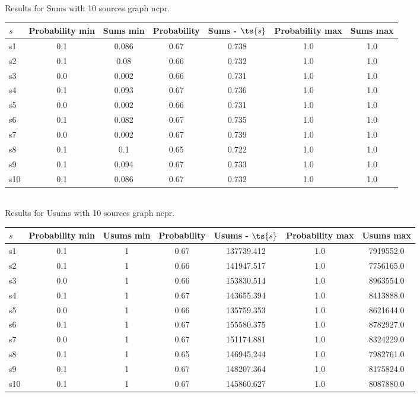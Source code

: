 \documentclass{article}
\begin{document}
\noindent Results for Sums with 10 sources graph ncpr.

\noindent\begin{tabular}{|l|c|c|c|c|c|c|}
\hline
$s$& Probability min & Sums min & Probability & Sums - $\ts{s}$ & Probability max & Sums max\\
\hline
s1 &0.1 & 0.086 & 0.67 & 0.738 & 1.0 & 1.0\\
\hline
s2 &0.1 & 0.08 & 0.66 & 0.732 & 1.0 & 1.0\\
\hline
s3 &0.0 & 0.002 & 0.66 & 0.731 & 1.0 & 1.0\\
\hline
s4 &0.1 & 0.093 & 0.67 & 0.736 & 1.0 & 1.0\\
\hline
s5 &0.0 & 0.002 & 0.66 & 0.731 & 1.0 & 1.0\\
\hline
s6 &0.1 & 0.082 & 0.67 & 0.735 & 1.0 & 1.0\\
\hline
s7 &0.0 & 0.002 & 0.67 & 0.739 & 1.0 & 1.0\\
\hline
s8 &0.1 & 0.1 & 0.65 & 0.722 & 1.0 & 1.0\\
\hline
s9 &0.1 & 0.094 & 0.67 & 0.733 & 1.0 & 1.0\\
\hline
s10 &0.1 & 0.086 & 0.67 & 0.732 & 1.0 & 1.0\\
\hline
\end{tabular}\\

\noindent Results for Usums with 10 sources graph ncpr.

\noindent\begin{tabular}{|l|c|c|c|c|c|c|}
\hline
$s$& Probability min & Usums min & Probability & Usums - $\ts{s}$ & Probability max & Usums max\\
\hline
s1 &0.1 & 1 & 0.67 & 137739.412 & 1.0 & 7919552.0\\
\hline
s2 &0.1 & 1 & 0.66 & 141947.517 & 1.0 & 7756165.0\\
\hline
s3 &0.0 & 1 & 0.66 & 153830.514 & 1.0 & 8963554.0\\
\hline
s4 &0.1 & 1 & 0.67 & 143655.394 & 1.0 & 8413888.0\\
\hline
s5 &0.0 & 1 & 0.66 & 135759.353 & 1.0 & 8621644.0\\
\hline
s6 &0.1 & 1 & 0.67 & 155580.375 & 1.0 & 8782927.0\\
\hline
s7 &0.0 & 1 & 0.67 & 151174.881 & 1.0 & 8324229.0\\
\hline
s8 &0.1 & 1 & 0.65 & 146945.244 & 1.0 & 7982761.0\\
\hline
s9 &0.1 & 1 & 0.67 & 148207.364 & 1.0 & 8175824.0\\
\hline
s10 &0.1 & 1 & 0.67 & 145860.627 & 1.0 & 8087880.0\\
\hline
\end{tabular}\\
\end{document}
